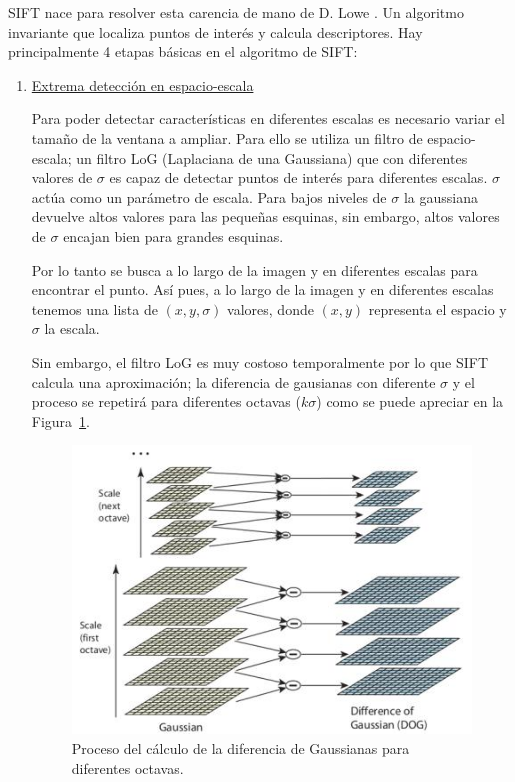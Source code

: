 SIFT nace para resolver esta carencia de mano de D. Lowe \parencite{Reference10}. Un algoritmo invariante que localiza puntos de interés y calcula descriptores. Hay principalmente 4 etapas básicas en el algoritmo de SIFT:

\begin{enumerate}
\item \underline{Extrema detección en espacio-escala}

Para poder detectar características en diferentes escalas es necesario variar el tamaño de la ventana a ampliar. Para ello se utiliza un filtro de espacio-escala; un filtro LoG (Laplaciana de una Gaussiana) que con diferentes valores de $\sigma$ es capaz de detectar puntos de interés para diferentes escalas. $\sigma$ actúa como un parámetro de escala. Para bajos niveles de $\sigma$ la gaussiana devuelve altos valores para las pequeñas esquinas, sin embargo, altos valores de $\sigma$ encajan bien para grandes esquinas.

Por lo tanto se busca a lo largo de la imagen y en diferentes escalas para encontrar el punto. Así pues, a lo largo de la imagen y en diferentes escalas tenemos una lista de $(x,y,\sigma)$ valores, donde $(x,y)$ representa el espacio y $\sigma$ la escala.

Sin embargo, el filtro LoG es muy costoso temporalmente por lo que SIFT calcula una aproximación; la diferencia de gausianas con diferente $\sigma$ y el proceso se repetirá para diferentes octavas ($k\sigma$) como se puede apreciar en la Figura~\ref{fig:shif_dog}.

\begin{figure}[ht]
\centering
\includegraphics[scale=0.7]{Figures/sift_dog.jpg}
\decoRule
\caption[Diferencia de gaussianas en SIFT]{Proceso del cálculo de la diferencia de Gaussianas para diferentes octavas.}
\label{fig:shif_dog}
\end{figure}


\end{enumerate}
